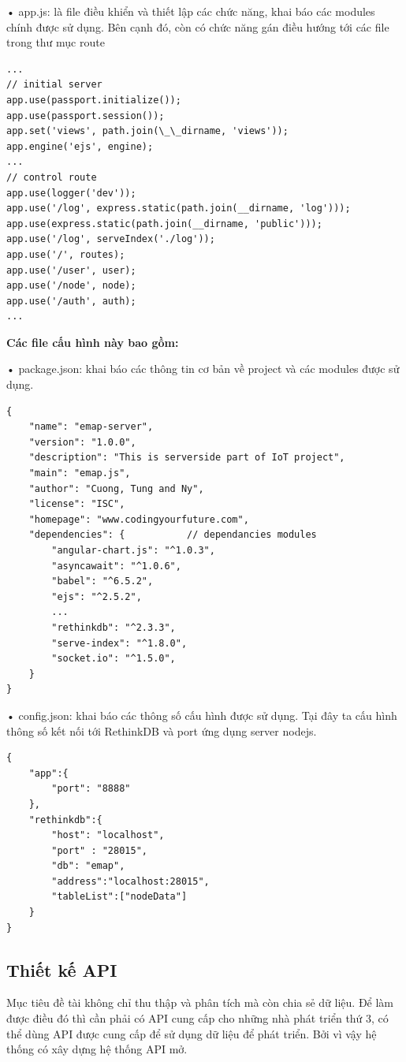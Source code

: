 • app.js: là file điều khiển và thiết lập các chức năng, khai báo các modules chính được sử dụng. Bên cạnh đó, còn có chức năng gán điều hướng tới các file trong thư mục route
\begin{lstlisting}[caption=app.js]
...
// initial server
app.use(passport.initialize());
app.use(passport.session());
app.set('views', path.join(\_\_dirname, 'views'));
app.engine('ejs', engine);
...
// control route
app.use(logger('dev'));
app.use('/log', express.static(path.join(__dirname, 'log')));
app.use(express.static(path.join(__dirname, 'public')));
app.use('/log', serveIndex('./log'));
app.use('/', routes);
app.use('/user', user);
app.use('/node', node);
app.use('/auth', auth);
...
\end{lstlisting}

\textbf{Các file cấu hình này bao gồm:}

• package.json: khai báo các thông tin cơ bản về project và các modules được sử dụng.
\begin{lstlisting}[caption=package.json]
{
	"name": "emap-server",
	"version": "1.0.0",
	"description": "This is serverside part of IoT project",
	"main": "emap.js",
	"author": "Cuong, Tung and Ny",
	"license": "ISC",
	"homepage": "www.codingyourfuture.com",
	"dependencies": {			// dependancies modules
		"angular-chart.js": "^1.0.3",
		"asyncawait": "^1.0.6",
		"babel": "^6.5.2",
		"ejs": "^2.5.2",
		...
		"rethinkdb": "^2.3.3",
		"serve-index": "^1.8.0",
		"socket.io": "^1.5.0",
	}
}
\end{lstlisting}
• config.json: khai báo các thông số cấu hình được sử dụng. Tại đây ta cấu hình thông số kết nối tới RethinkDB và port ứng dụng server nodejs.
\begin{lstlisting}[caption=config.json]
{
	"app":{
		"port": "8888"
	},
	"rethinkdb":{
		"host": "localhost",
		"port" : "28015",
		"db": "emap",
		"address":"localhost:28015",
		"tableList":["nodeData"]
	}
}

\end{lstlisting}



\subsection{Thiết kế API}

Mục tiêu đề tài không chỉ thu thập và phân tích mà còn chia sẻ dữ liệu. Để làm được điều đó thì cần phải có API cung cấp cho những nhà phát triển thứ 3, có thể dùng API được cung cấp để sử dụng dữ liệu để phát triển. Bởi vì vậy hệ thống có xây dựng hệ thống API mở.

